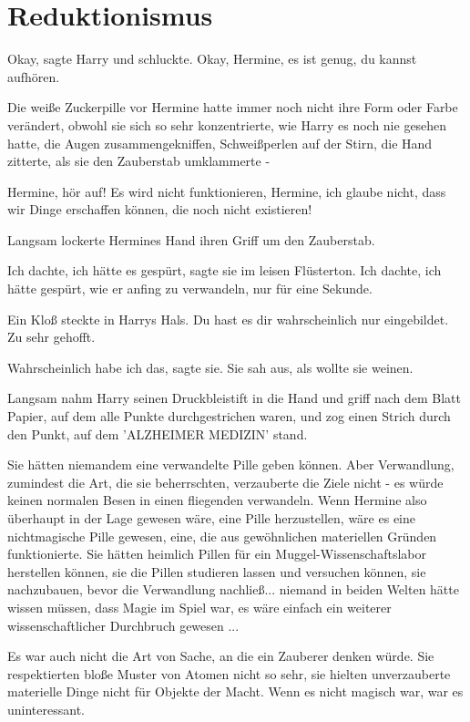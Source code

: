 \chapter{Reduktionismus}

\glqq{}Okay\grqq{}, sagte Harry und schluckte. \glqq{}Okay, Hermine, es ist
genug, du kannst aufhören.\grqq{}

Die weiße Zuckerpille vor Hermine hatte immer noch nicht ihre Form oder Farbe
verändert, obwohl sie sich so sehr konzentrierte, wie Harry es noch nie gesehen
hatte, die Augen zusammengekniffen, Schweißperlen auf der Stirn, die Hand
zitterte, als sie den Zauberstab umklammerte -

\glqq{}Hermine, hör auf! Es wird nicht funktionieren, Hermine, ich glaube nicht,
dass wir Dinge erschaffen können, die noch nicht existieren!\grqq{}

Langsam lockerte Hermines Hand ihren Griff um den Zauberstab.

\glqq{}Ich dachte, ich hätte es gespürt\grqq{}, sagte sie im leisen Flüsterton.
\glqq{}Ich dachte, ich hätte gespürt, wie er anfing zu verwandeln, nur für eine
Sekunde.\grqq{}

Ein Kloß steckte in Harrys Hals. \glqq{}Du hast es dir wahrscheinlich nur
eingebildet. Zu sehr gehofft.\grqq{}

\glqq{}Wahrscheinlich habe ich das\grqq{}, sagte sie. Sie sah aus, als wollte
sie weinen.

Langsam nahm Harry seinen Druckbleistift in die Hand und griff nach dem Blatt
Papier, auf dem alle Punkte durchgestrichen waren, und zog einen Strich durch
den Punkt, auf dem 'ALZHEIMER MEDIZIN' stand.

Sie hätten niemandem eine verwandelte Pille geben können. Aber Verwandlung,
zumindest die Art, die sie beherrschten, verzauberte die Ziele nicht - es würde
keinen normalen Besen in einen fliegenden verwandeln. Wenn Hermine also
überhaupt in der Lage gewesen wäre, eine Pille herzustellen, wäre es eine
nichtmagische Pille gewesen, eine, die aus gewöhnlichen materiellen Gründen
funktionierte. Sie hätten heimlich Pillen für ein Muggel-Wissenschaftslabor
herstellen können, sie die Pillen studieren lassen und versuchen können, sie
nachzubauen, bevor die Verwandlung nachließ... niemand in beiden Welten hätte
wissen müssen, dass Magie im Spiel war, es wäre einfach ein weiterer
wissenschaftlicher Durchbruch gewesen ...

Es war auch nicht die Art von Sache, an die ein Zauberer denken würde. Sie
respektierten bloße Muster von Atomen nicht so sehr, sie hielten unverzauberte
materielle Dinge nicht für Objekte der Macht. Wenn es nicht magisch war, war es
uninteressant.

